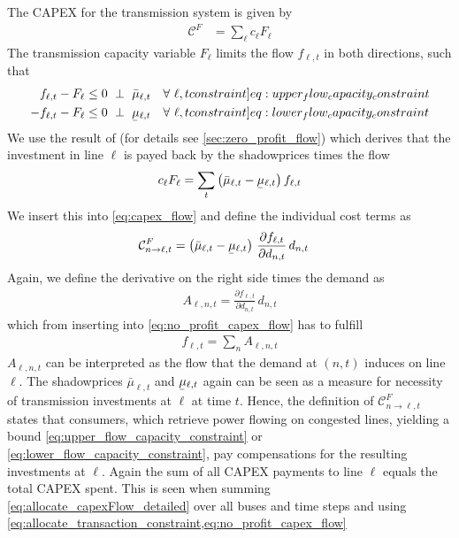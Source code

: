 \documentclass[11pt,twocolumn]{article}
\newcommand{\ubar}[1]{\underaccent{\bar}{#1}}
\newcommand{\resultsin}[1]{\hspace{6pt} \bot  \hspace{6pt} #1}
\newcommand{\Forall}[1]{\hspace{10pt} \forall \,\, #1 }
\newcommand{\pdv}[2]{\frac{\partial #1}{\partial #2}}
\newcommand{\capacityflow}{F_{\ell}}
\newcommand{\capitalpriceflow}{c_{\ell}}
\newcommand{\demand}[1][n]{d_{#1,t}}
\newcommand{\mulowerflow}{\ubar{\mu}_{\ell,t}}
\newcommand{\muupperflow}{\bar{\mu}_{\ell,t}}
\newcommand{\flow}{f_{\ell,t}}
\newcommand{\allocateflow}[1][n]{A_{\ell,#1,t}}
\newcommand{\allocatecapexflow}[1][n]{\mathcal{C}^{F}_{#1,t}}
\newcommand{\capexflow}{\mathcal{C}^F}
\begin{document}
The CAPEX for the transmission system is given by 
\begin{align}
 \capexflow & = \sum_\ell \capitalpriceflow \capacityflow
 \label{eq:capex_flow}
\end{align}
The transmission capacity variable $\capacityflow$ limits the flow $\flow$ in both directions, such that 
\begin{align}
\flow - \capacityflow &\le 0 \resultsin{\muupperflow} \Forall{\ell,t} 
\label[constraint]{eq:upper_flow_capacity_constraint} \\
- \flow - \capacityflow &\le 0 \resultsin{\mulowerflow} \Forall{\ell,t} 
\label[constraint]{eq:lower_flow_capacity_constraint}
\end{align}
We use the result of \cite{brown_decreasing_2020} (for details see \cref{sec:zero_profit_flow}) which derives that the investment in line $\ell$ is payed back by the shadowprices times the flow 
\begin{align}
\capitalpriceflow \capacityflow = \sum_{t} \left( \muupperflow - \mulowerflow \right)  \flow 
\label{eq:no_profit_capex_flow}
\end{align}
We insert this into \cref{eq:capex_flow} and define the individual cost terms  as 
\begin{align}
    \allocatecapexflow[n \rightarrow \ell] &=  
   \left( \muupperflow - \mulowerflow\right) \,  \pdv{\flow}{\demand}\, \demand
   \label{eq:allocate_capexFlow_detailed}
\end{align}
Again, we define the derivative on the right side times the demand as 
\begin{align}
 \allocateflow =  \pdv{\flow}{\demand}\, \demand
\end{align}
which from inserting into \cref{eq:no_profit_capex_flow} has to fulfill 
\begin{align}
 \flow = \sum_{n} \allocateflow
\label{eq:allocate_transaction_constraint}
\end{align}
$\allocateflow$ can be interpreted as the flow that the demand at $\left(n,t\right)$ induces on line $\ell$. The  shadowprices $\muupperflow$ and $\mulowerflow$ again can be seen as a measure for necessity of transmission investments at $\ell$ at time $t$. Hence, the definition of $\allocatecapexflow[n \rightarrow \ell]$ states that consumers, which retrieve power flowing on congested lines, yielding a bound \cref{eq:upper_flow_capacity_constraint} or \eqref{eq:lower_flow_capacity_constraint}, pay compensations for the resulting investments at $\ell$. Again the sum of all CAPEX payments to line $\ell$ equals the total CAPEX spent. This is seen when summing \cref{eq:allocate_capexFlow_detailed} over all buses and time steps and using \cref{eq:allocate_transaction_constraint,eq:no_profit_capex_flow}
\end{document}
